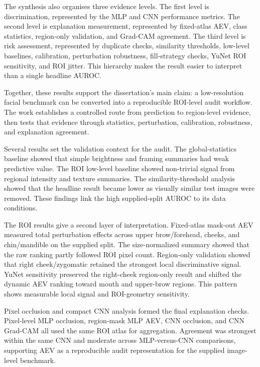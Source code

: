 The synthesis also organises three evidence levels. The first level is discrimination, represented by the MLP and CNN performance metrics. The second level is explanation measurement, represented by fixed-atlas AEV, class statistics, region-only validation, and Grad-CAM agreement. The third level is risk assessment, represented by duplicate checks, similarity thresholds, low-level baselines, calibration, perturbation robustness, fill-strategy checks, YuNet ROI sensitivity, and ROI jitter. This hierarchy makes the result easier to interpret than a single headline AUROC.


Together, these results support the dissertation's main claim: a low-resolution facial benchmark can be converted into a reproducible ROI-level audit workflow. The work establishes a controlled route from prediction to region-level evidence, then tests that evidence through statistics, perturbation, calibration, robustness, and explanation agreement.


Several results set the validation context for the audit. The global-statistics baseline showed that simple brightness and framing summaries had weak predictive value. The ROI low-level baseline showed non-trivial signal from regional intensity and texture summaries. The similarity-threshold analysis showed that the headline result became lower as visually similar test images were removed. These findings link the high supplied-split AUROC to its data conditions.


The ROI results give a second layer of interpretation. Fixed-atlas mask-out AEV measured total perturbation effects across upper brow/forehead, cheeks, and chin/mandible on the supplied split. The size-normalized summary showed that the raw ranking partly followed ROI pixel count. Region-only validation showed that right cheek/zygomatic retained the strongest local discriminative signal. YuNet sensitivity preserved the right-cheek region-only result and shifted the dynamic AEV ranking toward mouth and upper-brow regions. This pattern shows measurable local signal and ROI-geometry sensitivity.


Pixel occlusion and compact CNN analysis formed the final explanation checks. Pixel-level MLP occlusion, region-mask MLP AEV, CNN occlusion, and CNN Grad-CAM all used the same ROI atlas for aggregation. Agreement was strongest within the same CNN and moderate across MLP-versus-CNN comparisons, supporting AEV as a reproducible audit representation for the supplied image-level benchmark.


